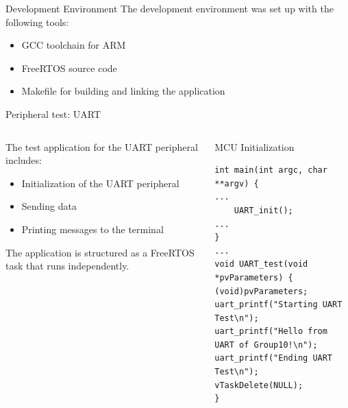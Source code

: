 \documentclass{beamer}
\begin{document}
\footlinecolor{}
\begin{frame}[fragile]{Development Environment}
    The development environment was set up with the following tools:
    \begin{itemize}
        \item GCC toolchain for ARM
        \item FreeRTOS source code
        \item Makefile for building and linking the application
    \end{itemize}
\end{frame}

\footlinecolor{}
\begin{frame}[fragile]{Peripheral test: UART}
    \begin{columns}
        \begin{column}{0.5\textwidth}
            The test application for the UART peripheral includes:
            \begin{itemize}
                \item Initialization of the UART peripheral
                \item Sending data
                \item Printing messages to the terminal
            \end{itemize}
            The application is structured as a FreeRTOS task that runs independently.
        \end{column}
        \begin{column}{0.5\textwidth}
            \begin{block}{MCU Initialization}
                    \begin{footnotesize}
                        \begin{verbatim}
int main(int argc, char **argv) {
...
    UART_init();
...
}
...
void UART_test(void *pvParameters) {
(void)pvParameters;
uart_printf("Starting UART Test\n");
uart_printf("Hello from UART of Group10!\n");
uart_printf("Ending UART Test\n");
vTaskDelete(NULL);
}
                        \end{verbatim}
                    \end{footnotesize}
            \end{block}
        \end{column}
    \end{columns}
\end{frame}
\end{document}
